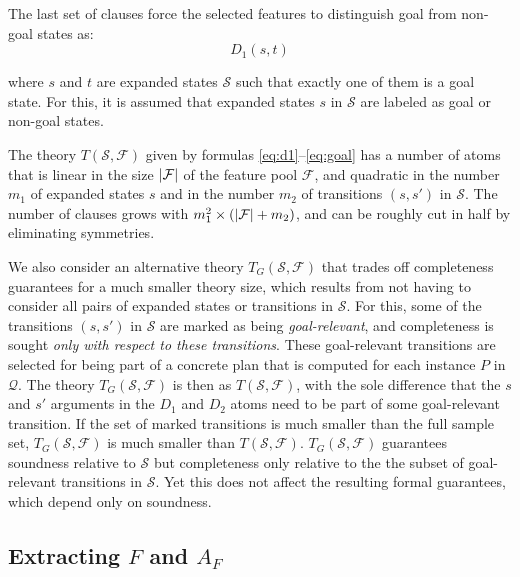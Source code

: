 \documentclass[letterpaper]{article} %
\newcommand{\abs}[1]{\ensuremath{\left\vert{#1}\right\vert}}
\newcommand{\Q}{\mathcal{Q}}
\newcommand{\F}{\mathcal{F}}
\renewcommand{\S}{\mathcal{S}}
\begin{document}
The last set of clauses force the selected features to distinguish goal
from non-goal states as:
\begin{equation}
  \label{eq:goal}
  D_1(s,t) 
\end{equation}

\noindent where  $s$ and $t$  are expanded states  $\S$ such that exactly one of them is a goal state. 
For this, it is assumed that expanded states $s$ in $\S$ are labeled as goal or non-goal states.

The theory $T(\S,\F)$ given by formulas \eqref{eq:d1}--\eqref{eq:goal}
has a number of atoms that is linear in the size $|{\cal F}|$  of the feature pool $\F$,
and quadratic in the number $m_1$ of expanded states $s$  and
in the number $m_2$ of transitions $(s,s')$ in $\S$.
The number of clauses grows with
$m_1^2 \times (\abs{{\cal F}} + m_2)$, and 
can be roughly cut in half by eliminating symmetries.

We also consider an alternative theory $T_G(\S,\F)$
that trades off completeness guarantees for a much smaller theory size, which
results from not having to consider
all pairs of expanded states or transitions in $\S$.
%
%
For this, some of the transitions $(s,s')$ in $\S$  are marked as being \emph{goal-relevant},
and completeness is sought \emph{only with respect to these transitions}.
These goal-relevant transitions are selected for being part of a concrete plan
that is computed for each instance $P$ in $\Q$. The theory  $T_G(\S,\F)$ is then as
 $T(\S,\F)$, with the sole difference that the $s$ and $s'$ arguments in the $D_1$ and $D_2$ atoms 
need to be part of some goal-relevant transition.
If the set of marked transitions is much smaller than the full sample set, %
$T_G(\S,\F)$ is much smaller than $T(\S,\F)$.
$T_G(\S,\F)$ guarantees soundness relative to $\S$
but completeness only relative to the the subset of goal-relevant transitions in $\S$.
Yet this does not affect the resulting formal guarantees, which depend only on soundness. 


\subsection{Extracting $F$ and  $A_F$}
\end{document}
